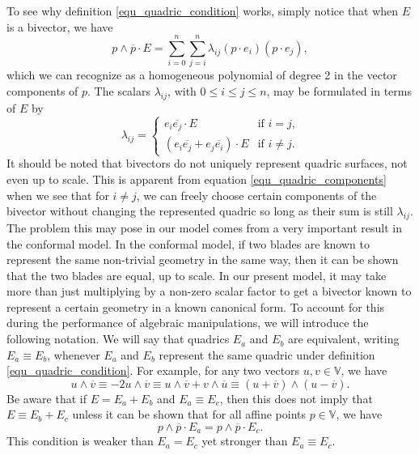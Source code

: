 \documentclass{birkjour}
\theoremstyle{definition}
\theoremstyle{remark}
\numberwithin{equation}{section}
\newcommand{\V}{\mathbb{V}}
\begin{document}
To see why definition \eqref{equ_quadric_condition} works, simply notice that when $E$ is a bivector, we have
\begin{equation}\label{equ_homogeneous_polynomial}
p\wedge\overline{p}\cdot E=\sum_{i=0}^n\sum_{j=i}^n \lambda_{ij}(p\cdot e_i)(p\cdot e_j),
\end{equation}
which we can recognize as a homogeneous polynomial of degree 2 in the vector components of $p$.
The scalars $\lambda_{ij}$, with $0\leq i\leq j\leq n$, may be formulated in terms of $E$ by
\begin{equation}\label{equ_quadric_components}
\lambda_{ij} = \left\{\begin{array}{ll}
e_i\overline{e_j}\cdot E & \mbox{if $i=j$,} \\
\left(e_i\overline{e_j}+e_j\overline{e_i}\right)\cdot E & \mbox{if $i\neq j$.}
\end{array}\right.
\end{equation}
It should be noted that bivectors do not uniquely represent quadric surfaces, not even up to scale.
This is apparent from equation \eqref{equ_quadric_components} when we see that for $i\neq j$,
we can freely choose certain components of the bivector without changing the represented
quadric so long as their sum is still $\lambda_{ij}$.  The problem this may pose in our model
comes from a very important result in the conformal model.  In the conformal model, if
two blades are known to represent the same non-trivial geometry in the same way,
then it can be shown that the two blades are equal, up to scale.
In our present model, it may take more than just
multiplying by a non-zero scalar factor to get a bivector known to represent a certain geometry in a
known canonical form.  To account for this during the performance of algebraic manipulations,
we will introduce the following notation.  We will say that quadrics $E_a$ and $E_b$ are
equivalent, writing $E_a\equiv E_b$, whenever $E_a$ and $E_b$ represent the same quadric
under definition \eqref{equ_quadric_condition}.  For example, for any two vectors $u,v\in\V$, we have
\begin{equation}
u\wedge\overline{v}\equiv -2u\wedge\overline{v}\equiv u\wedge\overline{v}+v\wedge\overline{u}
\equiv(u+\overline{v})\wedge(u-\overline{v}).
\end{equation}
Be aware that if $E=E_a+E_b$ and $E_a\equiv E_c$, then this does not imply that $E\equiv E_b+E_c$
unless it can be shown that for all affine points $p\in\V$, we have
\begin{equation}
p\wedge\overline{p}\cdot E_a=p\wedge\overline{p}\cdot E_c.
\end{equation}
This condition is weaker than $E_a=E_c$ yet stronger than $E_a\equiv E_c$.
\end{document}
